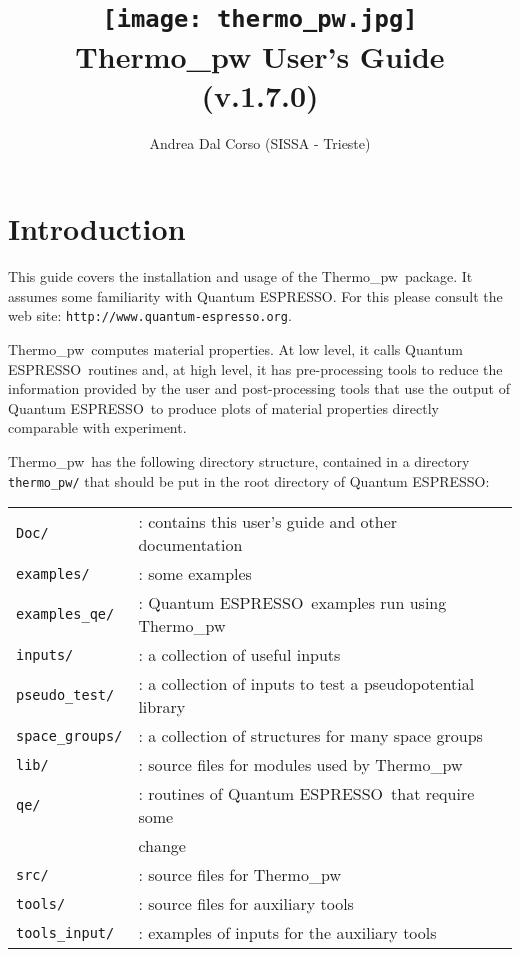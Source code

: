 \documentclass[12pt,a4paper,twoside]{report}
\def\version{1.7.0}
\def\qe{{\sc Quantum ESPRESSO}}
\def\thermo{{\sc Thermo}\_{\sc pw}}
\begin{document}
 

\author{Andrea Dal Corso (SISSA - Trieste)}
\date{}

\title{
  \texttt{[image: thermo\_pw.jpg]} \\
  \vspace{3truecm}
  \Huge \color{dark-blue} {\sc Thermo}\_{\sc pw} User's Guide \\
  (v.\version)
}

\maketitle

\newpage

\tableofcontents

\newpage

{\color{dark-blue}\chapter{Introduction}}
\color{black}
This guide covers the installation and usage of the \thermo\ package. 
It assumes some familiarity with \qe. 
For this please consult the web site: \texttt{http://www.quantum-espresso.org}.

\thermo\ computes material properties.
At low level, it calls \qe\ routines and, at high level, it has pre-processing
tools to reduce the information provided by the user and
post-processing tools that use the output of \qe\ to produce plots of material 
properties directly comparable with experiment. 

\thermo\ has the following directory structure, contained in a directory 
\texttt{thermo\_pw/} that should be put in the root directory of \qe:

\begin{tabular}{ll}
\texttt{Doc/}      & : contains this user's guide and other documentation\\
\texttt{examples/} & : some examples \\
\texttt{examples\_qe/} & : \qe\ examples run using 
\thermo \\
\texttt{inputs/}   & : a collection of useful inputs \\
\texttt{pseudo\_test/} & : a collection of inputs to test a pseudopotential library\\
\texttt{space\_groups/} & : a collection of structures for many space groups \\
\texttt{lib/}      & : source files for modules used by \thermo\ \\
\texttt{qe/}       & : routines of \qe\ that require some \\
                   &   change \\
\texttt{src/}      & : source files for \thermo\ \\
\texttt{tools/}    & : source files for auxiliary tools \\
\texttt{tools\_input/}  & : examples of inputs for the auxiliary tools \\
\end{tabular}\\
\end{document}

